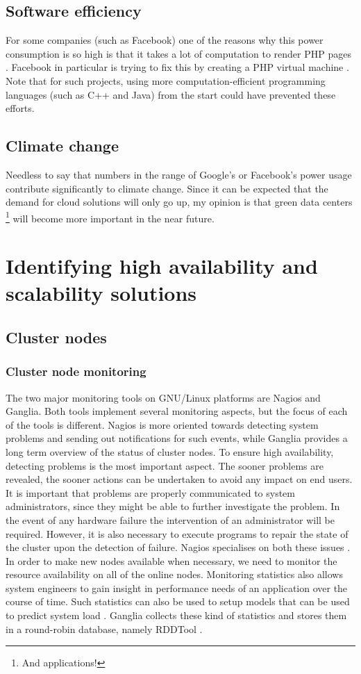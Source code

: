 \documentclass[12pt]{report}
\begin{document}
\section{Software efficiency}
For some companies (such as Facebook) one of the reasons why this
power consumption is so high is that it takes a lot of computation to
render PHP pages \cite{facebook_php}. Facebook in particular is trying
to fix this by creating a PHP virtual machine \cite{php_vm}.\\
Note that for such projects, using more computation-efficient
programming languages (such as C++ and Java) from the start could have
prevented these efforts.

\section{Climate change}
Needless to say that numbers in the range of Google's or Facebook's
power usage contribute significantly to climate change. Since it can
be expected that the demand for cloud solutions will only go up, my
opinion is that green data centers \footnote{And applications!} will become more
important in the near future.\\

\chapter{Identifying high availability and scalability solutions}
\section{Cluster nodes}
\subsection{Cluster node monitoring}
The two major monitoring tools on GNU/Linux platforms are Nagios and
Ganglia. Both tools implement several monitoring aspects, but the
focus of each of the tools is different. Nagios is more oriented
towards detecting system problems and sending out notifications for
such events, while Ganglia provides a long term overview of the status
of cluster nodes. To ensure high availability, detecting problems is
the most important aspect. The sooner problems are revealed, the
sooner actions can be undertaken to avoid any impact on end users. It
is important that problems are properly communicated to system
administrators, since they might be able to further investigate the
problem. In the event of any hardware failure the intervention of
an administrator will be required. However, it is also necessary to
execute programs to repair the state of the cluster
 upon the detection of failure. Nagios specialises on both these
 issues \cite{nagios:2013}.
In order to make new nodes available when necessary, we need to
monitor the resource availability on all of the online nodes.
Monitoring statistics also allows system engineers to gain insight in
performance needs of an application over the course of time. 
Such statistics can also be used to setup models that can be used to
predict system load \cite{andreolini:2006}. Ganglia collects these
kind of statistics and stores them in a round-robin database, namely RDDTool
\cite{ganglia:2013} \cite{rrdt:2013}.
\end{document}
